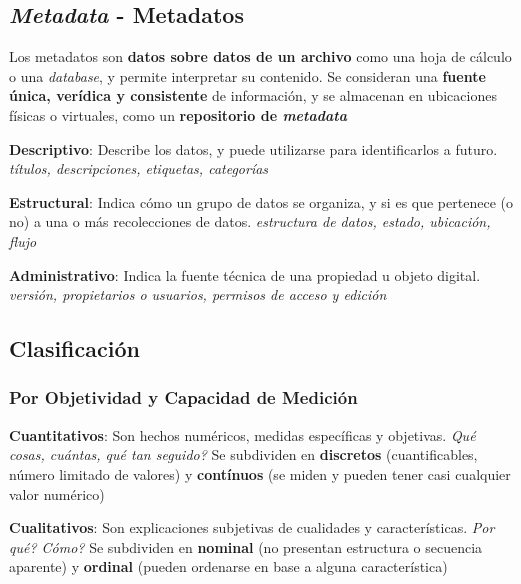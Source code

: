 \subsection{\textit{Metadata} - Metadatos}
Los metadatos son \textbf{datos sobre datos de un archivo} como una hoja de cálculo o una \textit{database}, y permite interpretar su contenido. Se consideran una \textbf{fuente única, verídica y consistente} de información, y se almacenan en ubicaciones físicas o virtuales, como un \textbf{repositorio de \textit{metadata}}

\begin{description}
        \item {\textbf{Descriptivo}: Describe los datos, y puede utilizarse para identificarlos a futuro. \textit{títulos, descripciones, etiquetas, categorías}}
        \item {\textbf{Estructural}: Indica cómo un grupo de datos se organiza, y si es que pertenece (o no) a una o más recolecciones de datos. \textit{estructura de datos, estado, ubicación, flujo}}
        \item {\textbf{Administrativo}: Indica la fuente técnica de una propiedad u objeto digital. \textit{versión, propietarios o usuarios, permisos de acceso y edición}}
\end{description}

\subsection{Clasificación}
\subsubsection{Por Objetividad y Capacidad de Medición}
\begin{description}
    \item{\textbf{Cuantitativos}: Son hechos numéricos, medidas específicas y objetivas. \textit{Qué cosas, cuántas, qué tan seguido?} Se subdividen en \textbf{discretos} (cuantificables, número limitado de valores) y \textbf{contínuos} (se miden y pueden tener casi cualquier valor numérico)}
    \item{\textbf{Cualitativos}: Son explicaciones subjetivas de cualidades y características. \textit{Por qué? Cómo?} Se subdividen en \textbf{nominal} (no presentan estructura o secuencia aparente) y \textbf{ordinal} (pueden ordenarse en base a alguna característica)}
\end{description}

